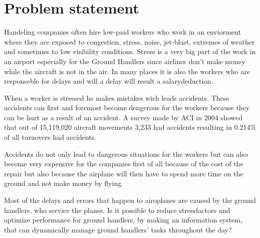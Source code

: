 \section{Problem statement}

Handeling companies often hire low-paid workers who work in an enviorment where they are exposed to congestion, stress, noise, jet-blast, extremes of weather and sometimes to low visibility conditions. Stress is a very big part of the work in an airport especially for the Ground Handlers since airlines don't make money while the aircraft is not in the air.  In many places it is also the workers who are responseble for delays and will a delay will result a salarydeduction.

When a worker is stressed he makes mistakes wich leads accidents. These accidents can first and foremost become dengerous for the workers because they can be hurt as a result of an accident. A survey made by ACI in 2004 showed that out of 15,119,020 aircraft movements 3,233 had accidents resulting in 0.214\% of all turnovers had accidents.

Accidents do not only lead to dangerous situations for the workers but can also become very expensive for the companies first of all because of the cost of the repair but also because the airplane will then have to spend more time on the ground and not make money by flying.


Most of the delays and errors that happen to airoplanes are caused by the ground handlers, who service the planes. Is it possible to reduce stressfactors and optimize performance for ground handlers, by making an information system, that can dynamically manage ground handlers' tasks throughout the day?